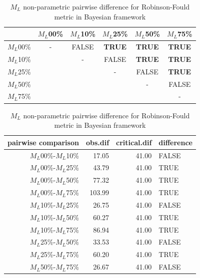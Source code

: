 \documentclass[12pt,letterpaper]{article}
\begin{document}
\begin{table}
\caption{$M_L$ non-parametric pairwise difference for Robinson-Fould metric in Bayesian framework}
\centering
\begin{tabular}{c|ccccc}
    \hline
              & $M_L$00\% & $M_L$10\% & $M_L$25\% & $M_L$50\% & $M_L$75\% \\
    \hline
    $M_L$00\% & - & FALSE & \textbf{TRUE} & \textbf{TRUE} & \textbf{TRUE}\\
    $M_L$10\% & & - & FALSE & \textbf{TRUE} & \textbf{TRUE} \\
    $M_L$25\% & & & - & FALSE & \textbf{TRUE} \\
    $M_L$50\% & & & & - & FALSE \\
    $M_L$75\% & & & & & - \\
    \hline
\end{tabular}
\centering
\begin{tabular}{rrrl}
 pairwise comparison & obs.dif & critical.dif & difference \\ 
  \hline
  $M_L$00\%-$M_L$10\% & 17.05 & 41.00 & FALSE \\ 
  $M_L$00\%-$M_L$25\% & 43.79 & 41.00 & TRUE \\ 
  $M_L$00\%-$M_L$50\% & 77.32 & 41.00 & TRUE \\ 
  $M_L$00\%-$M_L$75\% & 103.99 & 41.00 & TRUE \\ 
  $M_L$10\%-$M_L$25\% & 26.75 & 41.00 & FALSE \\ 
  $M_L$10\%-$M_L$50\% & 60.27 & 41.00 & TRUE \\ 
  $M_L$10\%-$M_L$75\% & 86.94 & 41.00 & TRUE \\ 
  $M_L$25\%-$M_L$50\% & 33.53 & 41.00 & FALSE \\ 
  $M_L$25\%-$M_L$75\% & 60.20 & 41.00 & TRUE \\ 
  $M_L$50\%-$M_L$75\% & 26.67 & 41.00 & FALSE \\ 
   \hline
\end{tabular}
\label{Ba_RF-ML_results}
\end{table}
\end{document}
